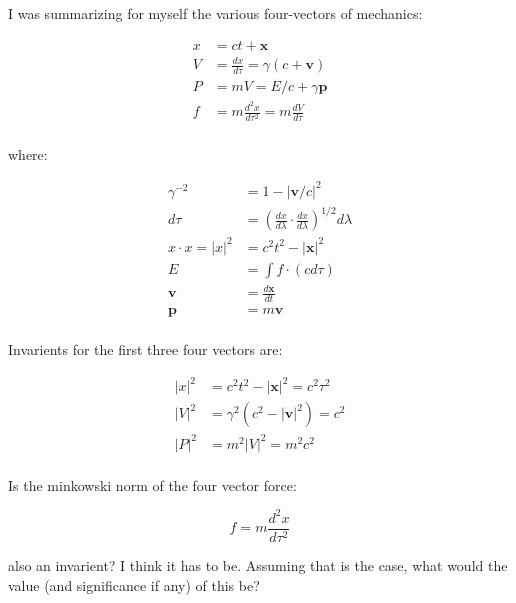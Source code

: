 \documentclass{article}      %
\title{} %
\author{Peeter Joot}         %
\begin{document}

\maketitle{}

\section{}

I was summarizing for myself the various four-vectors of mechanics:

\begin{align*}
x &= ct + \mathbf{x} \\
V &= \frac{dx}{d\tau} = \gamma(c + \mathbf{v}) \\
P &= m V = E/c + \gamma\mathbf{p} \\
f &= m\frac{d^2 x}{d\tau^2} = m\frac{d V}{d\tau} \\
\end{align*}

where:

\begin{align*}
\gamma^{-2} &= 1 - {\lvert \mathbf{v}/c \rvert}^2 \\
d\tau &= {\left(\frac{dx}{d\lambda} \cdot \frac{dx}{d\lambda}\right)}^{1/2} d\lambda \\
x \cdot x = {\lvert x \rvert}^2 &= c^2t^2 - {\lvert \mathbf{x} \rvert}^2 \\
E &= \int f \cdot (c d\tau) \\
\mathbf{v} &= \frac{d\mathbf{x}}{dt} \\
\mathbf{p} &= m\mathbf{v} \\
\end{align*}

Invarients for the first three four vectors are:

\begin{align*}
{\lvert x \rvert}^2 &= c^2 t^2 - {\lvert \mathbf{x} \rvert}^2 = c^2 \tau^2 \\
{\lvert V \rvert}^2 &= \gamma^2 (c^2 - {\lvert \mathbf{v} \rvert}^2) = c^2 \\
{\lvert P \rvert}^2 &= m^2 {\lvert V \rvert}^2 = m^2 c^2 \\
\end{align*}

Is the minkowski norm of the four vector force:

\[
f = m\frac{d^2 x}{d\tau^2} 
\]

also an invarient?  I think it has to be.  Assuming that is the case, what would the value (and significance if any) of this be?
\end{document}
